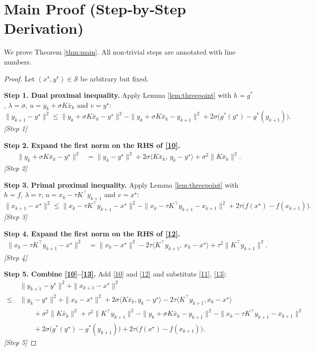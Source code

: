 \documentclass{article}
\begin{document}
\section*{Main Proof (Step‑by‑Step Derivation)}
We prove Theorem \ref{thm:main}.  All non‑trivial steps are annotated with line numbers.

\begin{proof}
Let $(x^{\star},y^{\star})\in\mathcal{S}$ be arbitrary but fixed.

\textbf{Step 1. Dual proximal inequality.}  
Apply Lemma \ref{lem:threepoint} with $h=g^{*}$, $\lambda=\sigma$, $u=y_{k}+\sigma K\bar{x}_{k}$ and $v=y^{\star}$:
\[
\|y_{k+1}-y^{\star}\|^{2}
\le
\|y_{k}+\sigma K\bar{x}_{k}-y^{\star}\|^{2}
- \|y_{k}+\sigma K\bar{x}_{k}-y_{k+1}\|^{2}
+2\sigma\bigl(g^{*}(y^{\star})-g^{*}(y_{k+1})\bigr).
\tag{10}
\]
\textit{[Step 1]}

\textbf{Step 2. Expand the first norm on the RHS of \eqref{10}.}
\[
\begin{aligned}
\|y_{k}+\sigma K\bar{x}_{k}-y^{\star}\|^{2}
&= \|y_{k}-y^{\star}\|^{2}
+2\sigma\langle K\bar{x}_{k},\,y_{k}-y^{\star}\rangle
+\sigma^{2}\|K\bar{x}_{k}\|^{2}.
\end{aligned}
\tag{11}
\]
\textit{[Step 2]}

\textbf{Step 3. Primal proximal inequality.}  
Apply Lemma \ref{lem:threepoint} with $h=f$, $\lambda=\tau$, $u=x_{k}-\tau K^{\top}y_{k+1}$ and $v=x^{\star}$:
\[
\|x_{k+1}-x^{\star}\|^{2}
\le
\|x_{k}-\tau K^{\top}y_{k+1}-x^{\star}\|^{2}
- \|x_{k}-\tau K^{\top}y_{k+1}-x_{k+1}\|^{2}
+2\tau\bigl(f(x^{\star})-f(x_{k+1})\bigr).
\tag{12}
\]
\textit{[Step 3]}

\textbf{Step 4. Expand the first norm on the RHS of \eqref{12}.}
\[
\begin{aligned}
\|x_{k}-\tau K^{\top}y_{k+1}-x^{\star}\|^{2}
&= \|x_{k}-x^{\star}\|^{2}
-2\tau\langle K^{\top}y_{k+1},\,x_{k}-x^{\star}\rangle
+\tau^{2}\|K^{\top}y_{k+1}\|^{2}.
\end{aligned}
\tag{13}
\]
\textit{[Step 4]}

\textbf{Step 5. Combine \eqref{10}–\eqref{13}.}  
Add \eqref{10} and \eqref{12} and substitute \eqref{11}, \eqref{13}:
\[
\begin{aligned}
&\|y_{k+1}-y^{\star}\|^{2}+\|x_{k+1}-x^{\star}\|^{2}\\
\le\;&\|y_{k}-y^{\star}\|^{2}+\|x_{k}-x^{\star}\|^{2}
+2\sigma\langle K\bar{x}_{k},y_{k}-y^{\star}\rangle
-2\tau\langle K^{\top}y_{k+1},x_{k}-x^{\star}\rangle\\
&\qquad +\sigma^{2}\|K\bar{x}_{k}\|^{2}
+\tau^{2}\|K^{\top}y_{k+1}\|^{2}
- \|y_{k}+\sigma K\bar{x}_{k}-y_{k+1}\|^{2}
- \|x_{k}-\tau K^{\top}y_{k+1}-x_{k+1}\|^{2}\\
&\qquad +2\sigma\bigl(g^{*}(y^{\star})-g^{*}(y_{k+1})\bigr)
+2\tau\bigl(f(x^{\star})-f(x_{k+1})\bigr).
\end{aligned}
\tag{14}
\]
\textit{[Step 5]}


\end{proof}
\end{document}
